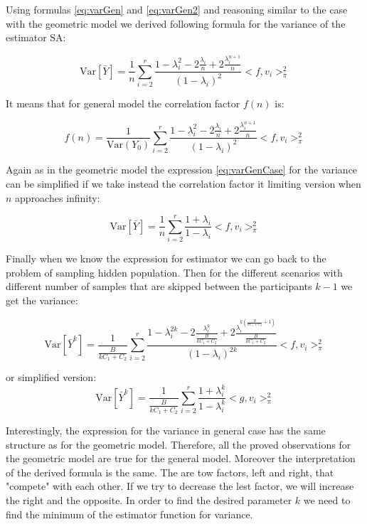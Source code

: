 \documentclass[12pt]{report}
\begin{document}
Using formulas \ref{eq:varGen} and \ref{eq:varGen2} and reasoning similar to the case with the geometric model we derived following formula for the variance of the estimator SA:

\begin{equation}
\label{eq:varGenCase}
 \mathrm{Var}\left[\bar{Y} \right] = \frac{1}{n} \sum_{i=2}^r\frac{1-\lambda_i^2 - 2\frac{\lambda_i}{n} + 2\frac{\lambda_i^{n+1}}{n}}{(1 - \lambda_i)^2} <f, v_i>^2_{\pi}
\end{equation}

It means that for general model the correlation factor $f(n)$ is:

$$ f(n) = \frac{1}{\mathrm{Var}(Y_0)} \sum_{i=2}^r\frac{1-\lambda_i^2 - 2\frac{\lambda_i}{n} + 2\frac{\lambda_i^{n+1}}{n}}{(1 - \lambda_i)^2} <f, v_i>^2_{\pi}$$

Again as in the geometric model the expression \ref{eq:varGenCase} for the variance can be simplified if we take instead the correlation factor it limiting version when $n$ approaches infinity:

$$ \mathrm{Var}\left[\bar{Y} \right] = \frac{1}{n} \sum_{i=2}^r\frac{1 + \lambda_i}{1 - \lambda_i} <f, v_i>^2_{\pi}$$

Finally when we know the expression for estimator we can go back to the problem of sampling hidden population. Then for the different scenarios with different number of samples that are skipped between the participants $k - 1$ we get the variance: 


\begin{equation}
\label{eq:genVarSkip}
\mathrm{Var}\left[\bar{Y}^k \right] =  \frac{1}{\frac{B}{kC_1 + C_2}} \sum_{i=2}^r\frac{1-\lambda_i^{2k} - 2\frac{\lambda_i^k}{\frac{B}{kC_1 + C_2}} + 2\frac{\lambda_i^{k\left(\frac{B}{kC_1 + C_2}+1\right)}}{\frac{B}{kC_1 + C_2}}}{(1 - \lambda_i)^{2k}} <f, v_i>^2_{\pi}
\end{equation}


or simplified version:
$$ \mathrm{Var}\left[\bar{Y}^k \right] = \frac{1}{\frac{B}{kC_1 + C_2}} \sum_{i=2}^r\frac{1 + \lambda_i^k}{1 - \lambda_i^k} <g, v_i>^2_{\pi}$$

Interestingly, the expression for the variance in general case has the same structure as for the geometric model. Therefore, all the proved observations for the geometric model are true for the general model. Moreover the interpretation of the derived formula is the same. The are tow factors, left and right, that "compete" with each other. If we try to decrease the lest factor, we will increase the right and the opposite. In order to find the desired parameter $k$ we need to find the minimum of the estimator function for variance. 
\end{document}
